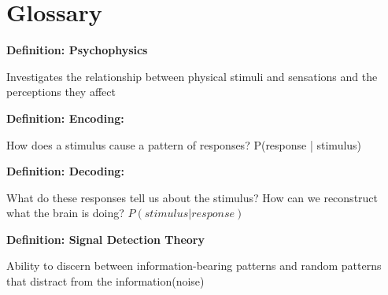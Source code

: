 \documentclass[11pt]{article}
\newcommand{\define}[2] {
  \textbf{Definition: #1}
  \begin{center} #2
\end{center}
}
\begin{document}
\section{Glossary}
\define{Psychophysics}{Investigates the relationship between physical stimuli and sensations and the perceptions they affect}
\define{Encoding:}{How does a stimulus cause a pattern of responses? P(response | stimulus)}
\define{Decoding:}{What do these responses tell us about the stimulus? How can we reconstruct what the brain is doing? $P(stimulus | response)$}
\define{Signal Detection Theory}{Ability to discern between information-bearing patterns and random patterns that distract from the information(noise)}
\end{document}
